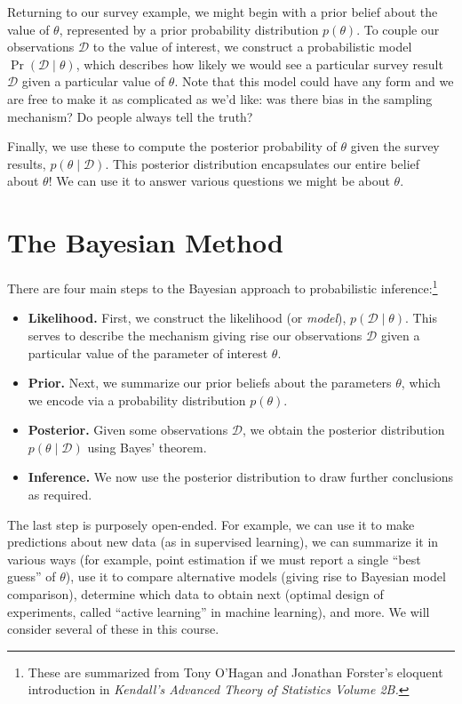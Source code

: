 \documentclass{article}
\newcommand{\given}{\mid}
\newcommand{\mc}[1]{\mathcal{#1}}
\newcommand{\data}{\mc{D}}
\begin{document}
Returning to our survey example, we might begin with a prior belief
about the value of $\theta$, represented by a prior probability
distribution $p(\theta)$. To couple our observations $\data$ to the
value of interest, we construct a probabilistic model $\Pr(\data
\given \theta)$, which describes how likely we would see a particular
survey result $\data$ given a particular value of $\theta$.  Note that
this model could have any form and we are free to make it as
complicated as we'd like: was there bias in the sampling mechanism?
Do people always tell the truth?

Finally, we use these to compute the posterior probability of $\theta$
given the survey results, $p(\theta \given \data)$.  This posterior
distribution encapsulates our entire belief about $\theta$! We can
use it to answer various questions we might be about $\theta$.

\section*{The Bayesian Method}

There are four main steps to the Bayesian approach to probabilistic
inference:\footnote{These are summarized from Tony O'Hagan and
  Jonathan Forster's eloquent introduction in \emph{Kendall's Advanced
    Theory of Statistics Volume 2B.}}
\begin{itemize}
\item \textbf{Likelihood.} First, we construct the likelihood (or
  \emph{model}), $p(\data \given \theta)$.  This serves to describe
  the mechanism giving rise our observations $\data$ given a
  particular value of the parameter of interest $\theta$.
\item \textbf{Prior.} Next, we summarize our prior beliefs about the
  parameters $\theta$, which we encode via a probability distribution
  $p(\theta)$.
\item \textbf{Posterior.} Given some observations $\data$, we obtain
  the posterior distribution $p(\theta \given \data)$ using Bayes'
  theorem.
\item \textbf{Inference.} We now use the posterior distribution to
  draw further conclusions as required.
\end{itemize}
The last step is purposely open-ended. For example, we can use it to
make predictions about new data (as in supervised learning), we can
summarize it in various ways (for example, point estimation if we must
report a single ``best guess'' of $\theta$), use it to compare
alternative models (giving rise to Bayesian model comparison),
determine which data to obtain next (optimal design of experiments,
called ``active learning'' in machine learning), and more.  We will
consider several of these in this course.
\end{document}
